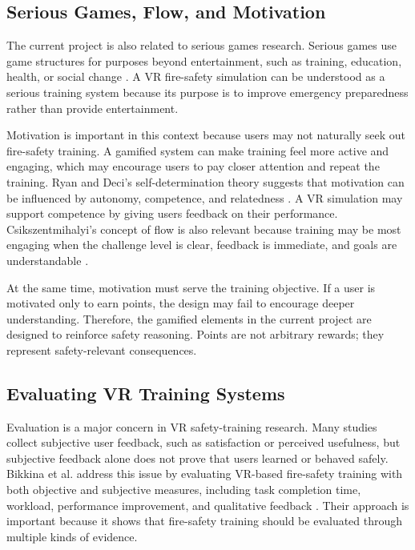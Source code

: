 \documentclass[manuscript, review]{acmart}
\begin{document}
{\subsection{Serious Games, Flow, and Motivation}

The current project is also related to serious games research. Serious games use game structures for purposes beyond entertainment, such as training, education, health, or social change \cite{abt1970serious,prensky2001digital,mcgonigal2011reality}. A VR fire-safety simulation can be understood as a serious training system because its purpose is to improve emergency preparedness rather than provide entertainment.

Motivation is important in this context because users may not naturally seek out fire-safety training. A gamified system can make training feel more active and engaging, which may encourage users to pay closer attention and repeat the training. Ryan and Deci's self-determination theory suggests that motivation can be influenced by autonomy, competence, and relatedness \cite{ryan2000self}. A VR simulation may support competence by giving users feedback on their performance. Csikszentmihalyi's concept of flow is also relevant because training may be most engaging when the challenge level is clear, feedback is immediate, and goals are understandable \cite{csikszentmihalyi1990flow}.

At the same time, motivation must serve the training objective. If a user is motivated only to earn points, the design may fail to encourage deeper understanding. Therefore, the gamified elements in the current project are designed to reinforce safety reasoning. Points are not arbitrary rewards; they represent safety-relevant consequences.

\subsection{Evaluating VR Training Systems}

Evaluation is a major concern in VR safety-training research. Many studies collect subjective user feedback, such as satisfaction or perceived usefulness, but subjective feedback alone does not prove that users learned or behaved safely. Bikkina et al. address this issue by evaluating VR-based fire-safety training with both objective and subjective measures, including task completion time, workload, performance improvement, and qualitative feedback \cite{bikkina2025learnings}. Their approach is important because it shows that fire-safety training should be evaluated through multiple kinds of evidence.

}
\end{document}
